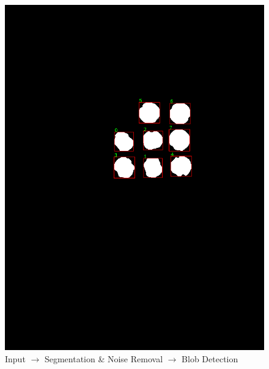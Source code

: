 \documentclass[runningheads,a4paper]{llncs}
\begin{document}
\begin{figure}[h]
\begin{center}
\includegraphics[scale=0.18]{out_3}
\caption{Input $\rightarrow$ Segmentation \& Noise Removal $\rightarrow$ Blob Detection }
\end{center}
\end{figure}
\end{document}
